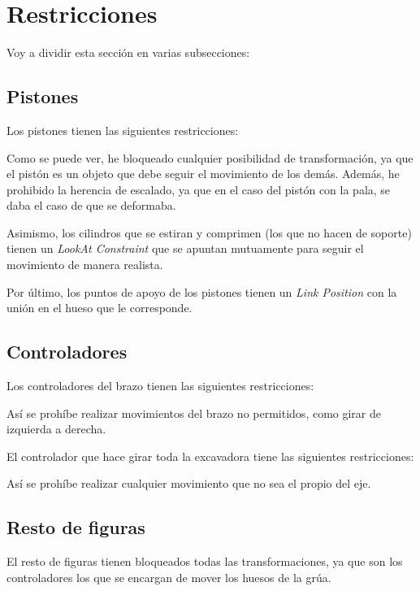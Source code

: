 \section{Restricciones}

Voy a dividir esta sección en varias subsecciones:

\subsection{Pistones}

Los pistones tienen las siguientes restricciones:


Como se puede ver, he bloqueado cualquier posibilidad de transformación, ya que el pistón es un objeto que debe seguir el movimiento de los demás. Además, he prohibido la herencia de escalado, ya que en el caso del pistón con la pala, se daba el caso de que se deformaba.

\bigskip

Asimismo, los cilindros que se estiran y comprimen (los que no hacen de soporte) tienen un \textit{LookAt Constraint} que se apuntan mutuamente para seguir el movimiento de manera realista.

\bigskip

Por último, los puntos de apoyo de los pistones tienen un \textit{Link Position} con la unión en el hueso que le corresponde.


\subsection{Controladores}

Los controladores del brazo tienen las siguientes restricciones:


Así se prohíbe realizar movimientos del brazo no permitidos, como girar de izquierda a derecha.

\bigskip

El controlador que hace girar toda la excavadora tiene las siguientes restricciones:


Así se prohíbe realizar cualquier movimiento que no sea el propio del eje.

\subsection{Resto de figuras}

El resto de figuras tienen bloqueados todas las transformaciones, ya que son los controladores los que se encargan de mover los huesos de la grúa.